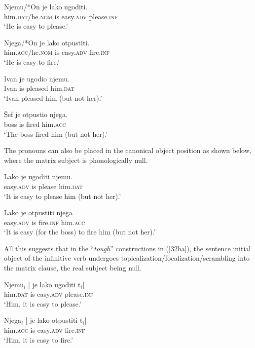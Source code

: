 \documentclass[output=paper]{langscibook}
\begin{document}
\begin{exe}
\ex \label{32ha}
\begin{xlist}
\ex \label{32aha}
\gll Njemu/*On je lako ugoditi.\\
him.\textsc{dat}/he.\textsc{nom} is easy.\textsc{adv} please.\textsc{inf}\\
\glt `He is easy to please.’

\ex
\gll Njega/*On je lako otpustiti.\\
him.\textsc{acc}/he.\textsc{nom} is easy.\textsc{adv} fire.\textsc{inf}\\
\glt ‘He is easy to fire.’
\end{xlist}

\ex \label{33ha}
\begin{xlist}
\ex \label{33aha}
\gll Ivan je ugodio  njemu.\\
Ivan is pleased him.\textsc{dat}\\
\glt ‘Ivan pleased him (but not her).’

\ex
\gll Šef je otpustio njega.\\
boss is fired him.\textsc{acc}\\
\glt `The boss fired him (but not her).’
\end{xlist}
\end{exe}

The pronouns can also be placed in the canonical object position as shown below, where the matrix subject is phonologically null. 

\begin{exe}
\ex \label{34ha}
\begin{xlist}
\ex \label{34aha}
\gll Lako je ugoditi njemu.\\
easy.\textsc{adv} is please him.\textsc{dat}\\
\glt ‘It is easy to please him (but not her).’

\ex \label{34bha}
\gll Lako je otpustiti njega\\
easy.\textsc{adv} is fire.\textsc{inf} him.\textsc{acc}\\
\glt ‘It is easy (for the boss) to fire him (but not her).’
\end{xlist}
\end{exe}

All this suggests that in the “\textit{tough}” constructions in (\ref{32ha}), the sentence initial object of the infinitive verb undergoes topicalization/focalization/scrambling into the matrix clause, the real subject being null.  

\begin{exe}
 \label{32'ha}
\begin{xlist}
\ex \label{32'aha}
\gll Njemu$_{i}$ [ je  lako  ugoditi t$_{i}$]\\
him.\textsc{dat} {} is easy.\textsc{adv} please.\textsc{inf}\\
\glt ‘Him, it is easy to please.’

\ex \label{32'bha}
\gll Njega$_{i}$  [ je  lako otpustiti t$_{i}$]\\
him.\textsc{acc} {} is easy.\textsc{adv} fire.\textsc{inf}\\
\glt ‘Him, it is easy to fire.’
\end{xlist}
\end{exe}
\end{document}
